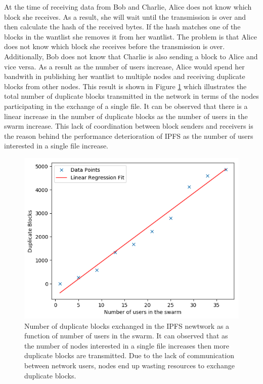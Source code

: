 {{{At the time of receiving data from Bob and Charlie, Alice does not know which block she receives. As a result, she will wait until the transmission is over and then calculate the hash of the received bytes. If the hash matches one of the blocks in the wantlist she removes it from her wantlist. The problem is that Alice does not know which block she receives before the transmission is over. Additionally, Bob does not know that Charlie is also sending a block to Alice and vice versa. As a result as the number of users increase, Alice would spend her bandwith in publishing her wantlist to multiple nodes and receiving duplicate blocks from other nodes. This result is shown in Figure \ref{fig:IPFSDups} which illustrates the total number of duplicate blocks transmitted in the network in terms of the nodes participating in the exchange of a single file. It can be observed that there is a linear increase in the number of duplicate blocks as the number of users in the swarm increase. This lack of coordination between block senders and receivers is the reason behind the performance deterioration of IPFS as the number of users interested in a single file increase.

\begin{figure}[!htb]
\centering
\includegraphics[width=\textwidth]{./results/ipfs_duplicates.png}
\caption{Number of duplicate blocks exchanged in the IPFS newtwork as a function of number of users in the swarm. It can observed that as the number of nodes interested in a single file increases then more duplicate blocks are transmitted. Due to the lack of communication between network users, nodes end up wasting resources to exchange duplicate blocks.}
\label{fig:IPFSDups}
\end{figure}

}}}
